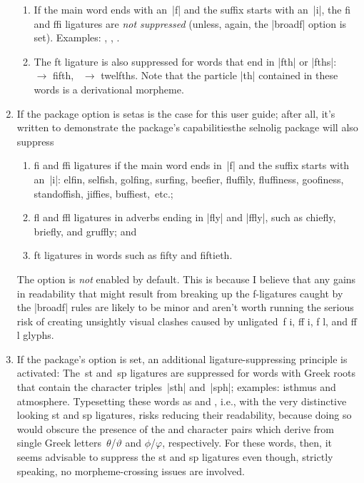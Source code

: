 \documentclass[11pt]{article}
\newcommand{\pkg}[1]{\textsf{#1}}
\newcommand{\opt}[1]{\uselig{\texttt{#1}}}
\begin{document}
\begin{enumerate}
\begin{enumerate}
\item If the main word ends with an~|f| and the suffix starts with an~|i|, the fi and ffi ligatures are \emph{not suppressed} (unless, again, the |broadf| option is set). Examples: 
, 
, 
.

\item The ft ligature is also suppressed for words that end in |fth| or |fths|: ~$\to$ fifth, ~$\to$ twelfths. Note that the particle |th| contained in these words is a derivational morpheme.

\end{enumerate}


\item 
If the \opt{broadf} package option is set\textemdash as is the case for this user guide; after all, it's written to demonstrate the package's capabilities\textemdash the \pkg{selnolig} package will also suppress
\begin{enumerate}
\item fi and ffi ligatures if the main word ends in~|f| and the suffix starts with an~|i|: elfin, selfish, golfing, surfing, beefier, fluffily, fluffiness, goofiness, standoffish, jiffies, buffiest,~etc.;
\item fl and ffl ligatures in adverbs ending in |fly| and |ffly|, such as chiefly, briefly, and gruffly; and
\item ft ligatures in words such as fifty and fiftieth.
\end{enumerate}


The option \opt{broadf} is \emph{not} enabled by default. This is because I believe that any gains in readability that might result from breaking up the f-ligatures caught by the |broadf| rules are likely to be minor and aren't worth running the serious risk of creating unsightly visual clashes caused by unligated~f\kern0pt i, ff\kern0pt i, f\kern0pt l, and ff\kern0pt l glyphs.

\item 
If the package's \opt{hdlig} option is set, an additional ligature-suppressing principle is activated:
The~st and~sp ligatures are suppressed for words with Greek roots that contain the character triples~|sth| and~|sph|; examples: isthmus and atmosphere. Typesetting these words as  and , i.e., with the very distinctive looking st and sp ligatures, risks reducing their readability, because doing so would obscure the presence of the \opt{th} and \opt{ph} character pairs which derive from single Greek letters~$\theta$/$\vartheta$ and $\phi$/$\varphi$, respectively. For these words, then, it seems advisable to suppress the st and sp ligatures even though, strictly speaking, no morpheme-crossing issues are involved. 


\end{enumerate}
\end{document}
